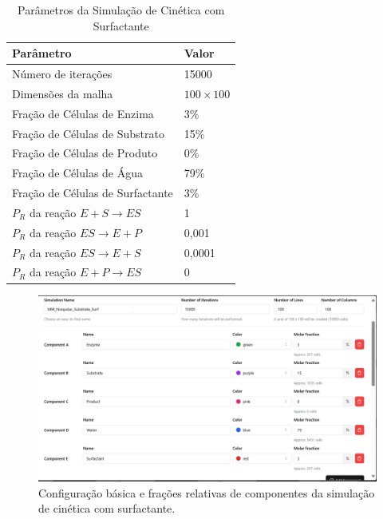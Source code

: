 \documentclass[12pt,oneside]{report}
\begin{document}
\begin{table}[H]
    \centering
    \caption{Parâmetros da Simulação de Cinética com Surfactante}
    \vspace{0.2cm}
    \begin{tabularx}{\textwidth}{X m{5cm}}
        \hline
        \textbf{Parâmetro}                     & \textbf{Valor}   \\
        \hline
        Número de iterações                    & 15000            \\
        Dimensões da malha                     & $100 \times 100$ \\
        Fração de Células de Enzima            & 3\%              \\
        Fração de Células de Substrato         & 15\%             \\
        Fração de Células de Produto           & 0\%              \\
        Fração de Células de Água              & 79\%             \\
        Fração de Células de Surfactante       & 3\%              \\
        $P_R$ da reação $E + S \rightarrow ES$ & 1                \\
        $P_R$ da reação $ES \rightarrow E + P$ & 0{,}001          \\
        $P_R$ da reação $ES \rightarrow E + S$ & 0{,}0001         \\
        $P_R$ da reação $E + P \rightarrow ES$ & 0                \\
        \hline
    \end{tabularx}
    \vspace{0.2cm}
    \label{tab:params_apolar_surfactante}
\end{table}

\begin{figure}[H]
    \centering
    \includegraphics[width=1\textwidth]{img/MM_surf.png}
    \caption{\small Configuração básica e frações relativas de componentes da simulação de cinética com surfactante.}
    \label{fig:apolar_surfactante}
\end{figure}
\end{document}
